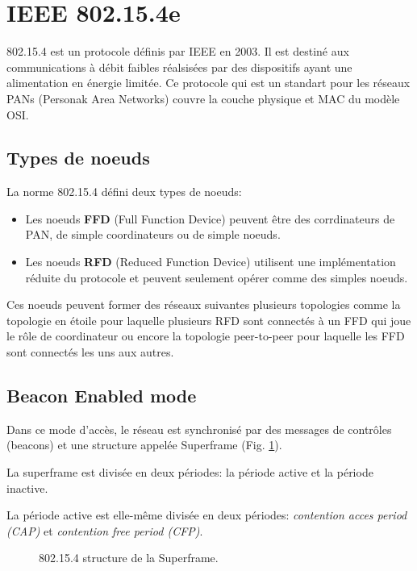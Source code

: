 \section{IEEE 802.15.4e}\label{sec:etat_art-802.15.4}
\renewcommand{\rightmark}{IEEE 802.15.4e}
    802.15.4 est un protocole définis par IEEE en 2003. Il est destiné aux communications à débit faibles réalsisées par des dispositifs ayant une alimentation en énergie limitée.
    Ce protocole qui est un standart pour les réseaux PANs (Personak Area Networks) couvre la couche physique et MAC du modèle OSI.


\subsection{Types de noeuds}\label{subsec:etat_art-802.15.4.nodes}
  La norme 802.15.4 défini deux types de noeuds:
  \begin{itemize}
    \item Les noeuds \textbf{FFD} (Full Function Device) peuvent être des corrdinateurs de PAN, de simple
          coordinateurs ou de simple noeuds.
    \item Les noeuds \textbf{RFD} (Reduced Function Device) utilisent une implémentation réduite du protocole
    et peuvent seulement opérer comme des simples noeuds.  
  \end{itemize}

  Ces noeuds peuvent former des réseaux suivantes plusieurs topologies
  comme la topologie en étoile pour laquelle plusieurs RFD sont connectés à un FFD qui
  joue le rôle de coordinateur ou encore la topologie peer-to-peer pour laquelle les FFD sont connectés les uns aux autres.


\subsection{Beacon Enabled mode}\label{subsec:etat_art-802.15.4.be}
  Dans ce mode d'accès, le réseau est synchronisé par des messages de contrôles (beacons)
  et une structure appelée Superframe (Fig. \ref{fig:etat_art-802.15.4.superframe}).
  
  La superframe est divisée en deux périodes: la période active et la période inactive.

  La période active est elle-même divisée en deux périodes:
  \textit{contention acces period (CAP)} et \textit{contention free period (CFP)}.

  \begin{figure}[H]
    \centering
    \caption{802.15.4 structure de la Superframe.}
    \label{fig:etat_art-802.15.4.superframe}
  \end{figure}

